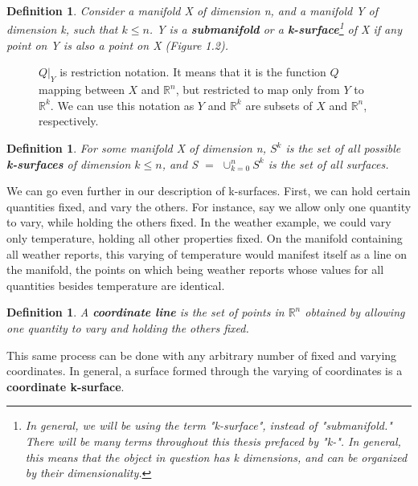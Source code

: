 \documentclass{book}
\newtheorem{defn}[equation]{Definition}
\begin{document}
\begin{defn}
	Consider a manifold X of dimension n, and a manifold Y of dimension k, such that $k \leq n$. Y is a \textbf{submanifold} or a \textbf{k-surface}\footnote{In general, we will be using the term "k-surface", instead of "submanifold." There will be many terms throughout this thesis prefaced by "k-". In general, this means that the object in question has k dimensions, and can be organized by their dimensionality.} of X if any point on Y is also a point on X (Figure 1.2). 
\end{defn}


\begin{figure}
\begin{center}
\end{center}
\caption{$Q|_Y$ is restriction notation. It means that it is the function $Q$ mapping between $X$ and $\mathbb{R}^n$, but restricted to map only from $Y$ to $\mathbb{R}^k$. We can use this notation as $Y$ and $\mathbb{R}^k$ are subsets of $X$ and $\mathbb{R}^n$, respectively.}
\end{figure}


\begin{defn}
	For some manifold X of dimension n, $S^k$ is the set of all possible \textbf{k-surfaces} of dimension $k \leq n$, and S $=$ $\cup^n_{k=0}S^k$ is the set of all surfaces. 
\end{defn}


We can go even further in our description of k-surfaces. First, we can hold certain quantities fixed, and vary the others. For instance, say we allow only one quantity to vary, while holding the others fixed. In the weather example, we could vary only temperature, holding all other properties fixed. On the manifold containing all weather reports, this varying of temperature would manifest itself as a line on the manifold, the points on which being weather reports whose values for all quantities besides temperature are identical. 
\begin{defn}
	A \textbf{coordinate line} is the set of points in $\mathbb{R}^n$ obtained by allowing one quantity to vary and holding the others fixed. 
\end{defn}

This same process can be done with any arbitrary number of fixed and varying coordinates. In general, a surface formed through the varying of coordinates is a \textbf{coordinate k-surface}. 
\end{document}
